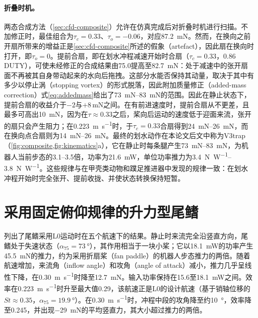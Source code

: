 \paragraph{折叠时机。}两态合成方法（\cref{sec:cfd-composite}）允许在仿真完成后对折叠时机进行扫描。不加修正时，最佳组合为$\tau_c=0.33$、$\tau_o=-0.06$，对应\SI{87.2}{\milli\newton}。然而，在换向之前开扇所带来的增益正是\cref{sec:cfd-composite}所述的假象（artefact），因此扇在换向时打开，即$\tau_o=0$。提前合扇，即在划水冲程减速开始时合扇（$\tau_c=0.33$，0.86\,DUTY），可使未经修正的合成结果由\SI{75.0}{}提高至\SI{82.7}{\milli\newton}：处于减速中的张开扇面不再被其自身带动起来的水向后拖拽。这部分水能否保持其动量，取决于其中有多少以停止涡（stopping vortex）的形式脱落，因此附加质量修正（added-mass correction）式\eqref{eq:addedmass}给出了\SIrange{73}{83}{\milli\newton}的范围。因此在静止状态下，提前合扇的收益介于$-2$与$+8$\,mN之间。在有前进速度时，提前合扇从不更差，且最多可高出\SI{10}{\milli\newton}，因为在$\tau\approx0.33$之后，桨向后运动的速度低于迎面来流，张开的扇只会产生阻力；在\SI{0.223}{\metre\per\second}时，于$\tau_c=0.33$合扇得到\SIrange{24}{26}{\milli\newton}，而在换向点合扇则为\SIrange{14}{26}{\milli\newton}。最终的划水动作在本论文后文中称为V3trap（\cref{fig:composite,fig:kinematics}a），它在静止时每条腿产生\SIrange{73}{83}{\milli\newton}，为机器人当前步态的3.1--3.5倍，功率为\SI{21.6}{\milli\watt}，单位功率推力为\SIrange{3.4}{3.8}{\newton\per\watt}。这些规律与在甲壳类动物和蹼足推进器中发现的规律一致：在划水冲程开始时完全张开、提前收拢、并使状态转换保持短暂\cite{Santos2026,Lin2024}。

\section{采用固定俯仰规律的升力型尾鳍}
\label{sec:res-lift}

列出了尾鳍采用L0运动时在五个航速下的结果。静止时来流完全沿竖直方向，尾鳍处于失速状态（$\alpha_{75}=\SI{73}{\degree}$），其作用相当于一块小桨；它以\SI{18.1}{\milli\watt}的功率产生\SI{45.5}{\milli\newton}的推力，约为采用折扇桨（fan paddle）的机器人步态推力的两倍。随着航速增加，来流角（inflow angle）和攻角（angle of attack）减小，推力几乎呈线性下降，在\SI{0.30}{\metre\per\second}时降至\SI{12.7}{\milli\newton}。输入功率保持在\SI{15.6}{}至\SI{18.1}{\milli\watt}之间。效率在\SI{0.223}{\metre\per\second}时升至最大值0.29，该航速正是L0的设计航速（基于销轴位移的$\mathit{St}\approx0.35$，$\alpha_{75}=\SI{19.9}{\degree}$）。在\SI{0.30}{\metre\per\second}时，冲程中段的攻角降至约\SI{10}{\degree}，效率降至0.245，并出现\SI{-29}{\milli\newton}的平均竖直力，其大小超过推力的两倍。

